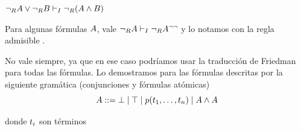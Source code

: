 \begin{lemma}
    \label{fri:lemma:fnot-dist-over-and-right}
    \(
    \neg_R A \vee \neg_R B \vdash_I \neg_R(A \wedge B)
    \)
\end{lemma}

\begin{lemma}
    \label{fri:lemma:notr-trans-intro}
    Para algunas fórmulas $A$, vale $\neg_R A \vdash_I \neg_R A^{\neg\neg}$ y lo notamos con la regla admisible .
    
    No vale siempre, ya que en ese caso podríamos usar la traducción de Friedman para todas las fórmulas. Lo demostramos para las fórmulas descritas por la siguiente gramática (conjunciones y fórmulas atómicas)
    \[
        A ::=
            \bot \mid \top \mid p(t_1, \dots, t_n)
            \mid A \wedge A
    \]

    donde $t_i$ son términos
\end{lemma}
